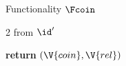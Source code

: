 \begin{interface}[nofloat]{Functionality $\Fcoin$ \\
\params{$\PID$, \quad $\Ps$, \quad $\admits$, \quad
$\uses := \{(\Adv,\serves)\}$, \quad $\pars := \none$}}
{\begin{multicols}{2}
 \quad from $\id'$
\begin{algorithmic}[1]
\algcont
\State \textbf{return} $(\V{coin}, \V{rel})$ \label{ln:coinleak}
\algsave
\end{algorithmic}
\end{multicols}}
\end{interface}
